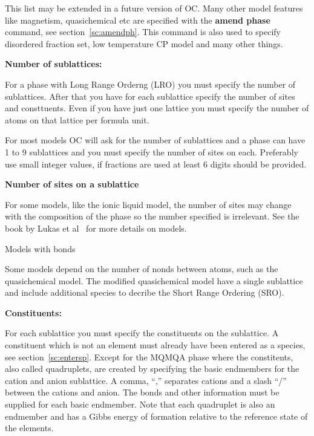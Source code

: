 \documentclass[11pt]{article}
\begin{document}
This list may be extended in a future version of OC.  Many other model
features like magnetism, quasichemical etc are specified with the {\bf
  amend phase} command, see section~\ref{sc:amendph}.  This command is
also used to specify disordered fraction set, low temperature CP model
and many other things.

\hypertarget{Enter phase subl}{{\bf Number of sublattices:}}

For a phase with Long Range Orderng (LRO) you must specify the number
of sublattices.  After that you have for each sublattice specify the
number of sites and consttuents.  Even if you have just one lattice
you must specify the number of atoms on that lattice per formula unit.

For most models OC will ask for the number of sublattices and a phase
can have 1 to 9 sublattices and you must specify the number of sites
on each.  Preferably use small integer values, if fractions are used
at least 6 digits should be provided.

\hypertarget{Enter phase sites}{{\bf Number of sites on a sublattice }}

For some models, like the ionic liquid model, the number of sites may
change with the composition of the phase so the number specified is
irrelevant.  See the book by Lukas et al~\cite{07Luk} for more details
on models.

\hypertarget{Enter phase bonds}{Models with bonds}

Some models depend on the number of nonds between atoms, such as the
quasichemical model.  The modified quasichemical model have a single
sublattice and include additional species to decribe the Short Range
Ordering (SRO).


\hypertarget{Enter phase constituents}{}
\hypertarget{Enter phase constit}{}
{\bf Constituents:}

For each sublattice you must specify the constituents on the
sublattice.  A constituent which is not an element must already have
been entered as a species, see section~\ref{sc:entersp}.  Except for
the MQMQA phase where the constitents, also called quadruplets, are
created by specifying the basic endmembers for the cation and anion
sublattice.  A comma, ``,'' separates cations and a slash ``/''
between the cations and anion.  The bonds and other information must
be supplied for each basic endmember.  Note that each quadruplet is
also an endmember and has a Gibbs energy of formation relative to the
reference state of the elements.
\end{document}
